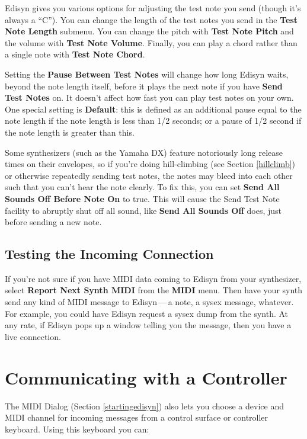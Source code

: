 \documentclass{article}
\begin{document}
Edisyn gives you various options for adjusting the test note you send (though it's always a ``C'').  You can change the length of the test notes you send in the {\bf Test Note Length} submenu.  You can change the pitch with {\bf Test Note Pitch} and the volume with {\bf Test Note Volume}.   Finally, you can play a chord rather than a single note with {\bf Test Note Chord}.  

Setting the {\bf Pause Between Test Notes} will change how long Edisyn waits, beyond the note length itself, before it plays the next note if you have {\bf Send Test Notes} on.  It doesn't affect how fast you can play test notes on your own.  One special setting is {\bf Default}: this is defined as an additional pause equal to the note length if the note length is less than 1/2 seconds; or a pause of 1/2 second if the note length is greater than this.

Some synthesizers (such as the Yamaha DX) feature notoriously long release times on their envelopes, so if you're doing hill-climbing (see Section \ref{hillclimb}) or otherwise repeatedly sending test notes, the notes may bleed into each other such that you can't hear the note clearly.  To fix this, you can set {\bf Send All Sounds Off Before Note On} to true.  This will cause the Send Test Note facility to abruptly shut off all sound, like {\bf Send All Sounds Off} does, just before sending a new note.

\subsection{Testing the Incoming Connection}

If you're not sure if you have MIDI data coming to Edisyn from your synthesizer, select {\bf Report Next Synth MIDI} from the {\bf MIDI} menu.  Then have your synth send any kind of MIDI message to Edisyn\,---\,a note, a sysex message, whatever.  For example, you could have Edisyn request a sysex dump from the synth.  At any rate, if Edisyn pops up a window telling you the message, then you have a live connection.  

\section{Communicating with a Controller}

The MIDI Dialog (Section \ref{startingedisyn}) also lets you choose a device and MIDI channel for incoming messages from a control surface or controller keyboard.  Using this keyboard you can:
\end{document}
